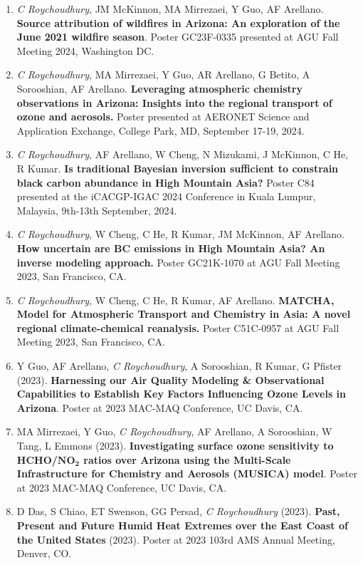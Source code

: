 \documentclass[margin,line]{resume}
\begin{document}
\begin{resume}
\begin{enumerate}[topsep=1pt, partopsep=1pt, itemsep=0.5pt, parsep=0.1pt, leftmargin=15pt,label=\arabic*.]
			\item \textit{C Roychoudhury}, JM McKinnon, MA Mirrezaei, Y Guo, AF Arellano. \textbf{Source attribution of wildfires in Arizona: An exploration of the June 2021 wildfire season}. Poster GC23F-0335 presented at AGU Fall Meeting 2024, Washington DC. 
			
			\item \textit{C Roychoudhury}, MA Mirrezaei, Y Guo, AR Arellano, G Betito, A Sorooshian, AF Arellano.  \textbf{Leveraging atmospheric chemistry observations in Arizona: Insights into the regional transport of ozone and aerosols.} Poster presented at AERONET Science and Application Exchange, College Park, MD, September 17-19, 2024.
			
			\item \textit{C Roychoudhury}, AF Arellano, W Cheng, N Mizukami, J McKinnon, C He, R Kumar. \textbf{Is traditional Bayesian inversion sufficient to constrain black carbon abundance in High Mountain Asia?} Poster C84 presented at the iCACGP-IGAC 2024 Conference in Kuala Lumpur, Malaysia, 9th-13th September, 2024.
			
			\item \textit{C Roychoudhury}, W Cheng, C He, R Kumar, JM McKinnon, AF Arellano. \textbf{How uncertain are BC emissions in High Mountain Asia? An inverse modeling approach.} Poster GC21K-1070 at AGU Fall Meeting 2023, San Francisco, CA. 
			
			\item \textit{C Roychoudhury}, W Cheng, C He, R Kumar, AF Arellano. \textbf{MATCHA, Model for Atmospheric Transport and Chemistry in Asia: A novel regional climate-chemical reanalysis.} Poster C51C-0957 at AGU Fall Meeting 2023, San Francisco, CA.
			
			\item Y Guo, AF Arellano, \textit{C Roychoudhury}, A Sorooshian, R Kumar, G Pfister (2023). \textbf{Harnessing our Air Quality Modeling \& Observational Capabilities to Establish Key Factors Influencing Ozone Levels in Arizona}. Poster at 2023 MAC-MAQ Conference, UC Davis, CA.
			
			\item MA Mirrezaei, Y Guo, \textit{C Roychoudhury}, AF Arellano, A Sorooshian, W Tang, L Emmons (2023). \textbf{Investigating surface ozone sensitivity to HCHO/$\mathbf{NO_2}$ ratios over Arizona using the Multi-Scale Infrastructure for Chemistry and Aerosols (MUSICA) model}. Poster at 2023 MAC-MAQ Conference, UC Davis, CA.
			
			\item D Das, S Chiao, ET Swenson, GG Persad, \textit{C Roychoudhury} (2023). \textbf{Past, Present and Future Humid Heat Extremes over the East Coast of the United States} (2023). Poster at 2023 103rd AMS Annual Meeting, Denver, CO. 
			

\end{enumerate}
\end{resume}
\end{document}

